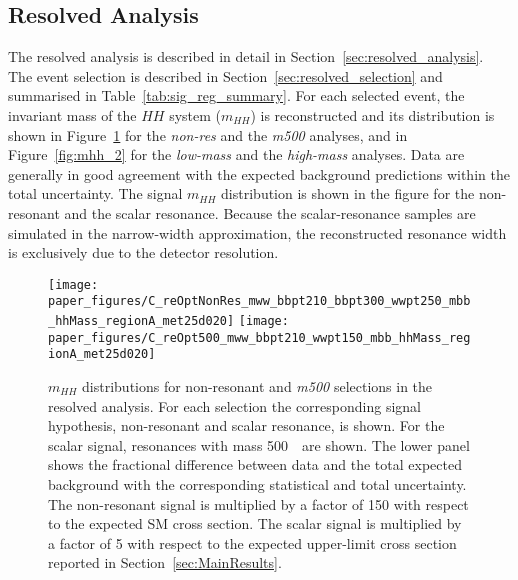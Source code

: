 \subsection{Resolved Analysis}
\label{sec:results}
 
The resolved analysis  is described in detail in
Section~\ref{sec:resolved_analysis}. The event selection is described in
Section~\ref{sec:resolved_selection} and summarised in
Table~\ref{tab:sig_reg_summary}. For each selected event, the
invariant mass of the $HH$ system ($m_{HH}$) is reconstructed and its distribution is shown in Figure~\ref{fig:mhh_1} for the \emph{non-res} and the \emph{m500} analyses, and in Figure~\ref{fig:mhh_2} for the \emph{low-mass} and the \emph{high-mass} analyses.
Data are generally in good agreement with the expected
background predictions within the total uncertainty.
The signal $m_{HH}$ distribution is shown in the figure for the non-resonant and the scalar resonance.
Because the scalar-resonance samples are simulated in the narrow-width approximation,  the
reconstructed resonance width is exclusively due to the detector
resolution. 
 
\begin{figure}
\begin{center}
\texttt{[image: paper\_figures/C\_reOptNonRes\_mww\_bbpt210\_bbpt300\_wwpt250\_mbb\_hhMass\_regionA\_met25d020]}
\texttt{[image: paper\_figures/C\_reOpt500\_mww\_bbpt210\_wwpt150\_mbb\_hhMass\_regionA\_met25d020]}
\end{center}
\caption{$m_{HH}$ distributions for non-resonant and \emph{m500} selections in the resolved analysis. For each selection the corresponding signal hypothesis, non-resonant and scalar resonance, is shown. For the scalar signal, resonances with mass 500~\GeV\ are shown. The lower panel shows the fractional difference between data and the total expected background
 with the corresponding statistical and total uncertainty. The non-resonant signal is multiplied by a factor of 150 with respect to the expected SM cross section.  The scalar signal is multiplied by a factor of 5 with respect to the expected upper-limit cross section reported in Section~\ref{sec:MainResults}. }
\label{fig:mhh_1}
\end{figure}
 
